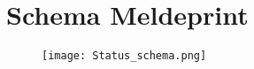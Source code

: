 \section{Schema Meldeprint}\label{Schema_Melderpint}
\begin{figure}[h!]
	\centering
	\texttt{[image: Status\_schema.png]}
\end{figure}
